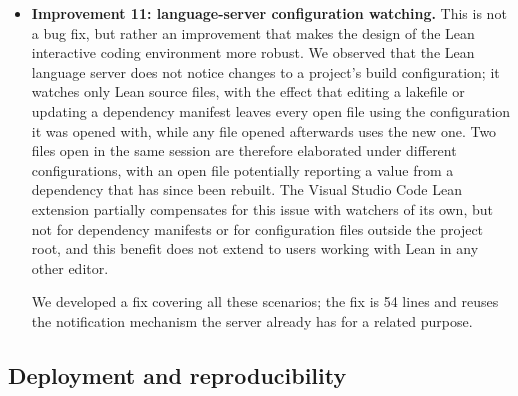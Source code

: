 \documentclass{article}
\newcommand{\Lean}{Lean\xspace}      %
\newcommand{\mathlib}{Mathlib\xspace}
\begin{document}
\begin{itemize}
As a demonstration that this is not the end of the story and that the fork-safety situation can nonetheless be improved, we offer a fix: a 61-line change to \Lean's runtime that makes forking work correctly, under specific assumptions on when it is used, and is verified over 40 consecutive trials producing byte-identical results, including when the process is duplicated in the middle of its own elaboration. The technical details are discussed in Section~\ref{sec:tn-10}.

A related question that also bears asking is whether forking is actually \emph{useful}. We investigated that as well, and found that on Linux, duplicating a \mathlib-loaded process costs tens of milliseconds, and can bring a single proof check on a small server down to a quarter of a second --- one of the most significant savings we were able to measure. On macOS however the same operation costs several seconds and is simply not worth performing. See Section~\ref{sec:tn-10} for further discussion and details.

\item \textbf{Improvement 11: language-server configuration watching.}
This is not a bug fix, but rather an improvement that makes the design of the \Lean interactive coding environment more robust.
We observed that the \Lean language server does not notice changes to a project's build configuration; it watches only \Lean source files, with the effect that editing a lakefile or updating a dependency manifest leaves every open file using the configuration it was opened with, while any file opened afterwards uses the new one. 
Two files open in the same session are therefore elaborated under different configurations, with an open file potentially reporting a value from a dependency that has since been rebuilt.
The Visual Studio Code \Lean extension partially compensates for this issue with watchers of its own, but not for dependency manifests or for configuration files outside the project root, and this benefit does not extend to users working with \Lean in any other editor. 

We developed a fix covering all these scenarios; the fix is 54 lines and reuses the notification mechanism the server already has for a related purpose.

\end{itemize}

\subsection{Deployment and reproducibility}
\end{document}
